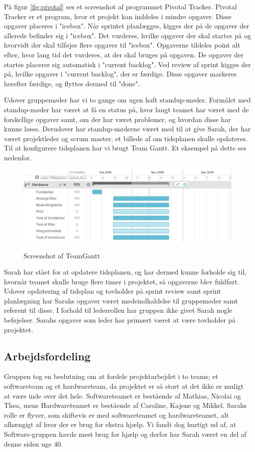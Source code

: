 På figur \vref{fig:pivotal} ses et screenshot af programmet Pivotal Tracker. Pivotal Tracker er et program, hvor et projekt kan inddeles i mindre opgaver. Disse opgaver placeres i "icebox". Når sprintet planlægges, kigges der på de opgaver der allerede befinder sig i "icebox". Det vurderes, hvilke opgaver der skal startes på og hvorvidt der skal tilføjes flere opgaver til "icebox". Opgaverne tildeles point alt efter, hvor lang tid det vurderes, at der skal bruges på opgaven. De opgaver der startes placerer sig automatisk i "current backlog". Ved review af sprint kigges der på, hvilke opgaver i "current backlog", der er færdige. Disse opgaver markeres herefter færdige, og flyttes dermed til "done". 

Udover gruppemøder har vi to gange om ugen haft standup-møder. Formålet med standup-møder har været at få en status på, hvor langt teamet har været med de forskellige opgaver samt, om der har været problemer, og hvordan disse har kunne løses. Derudover har standup-møderne været med til at give Sarah, der har været projektleder og scrum master, et billede af om tidsplanen skulle opdateres. Til at konfigurere tidsplanen har vi brugt Team Gantt. Et eksempel på dette ses nedenfor. 

	\begin{figure}[h!]
	\centering
	\includegraphics[width=0.9\linewidth]{Udviklingsproces/Metode/TeamGantt}
	\label{fig:teamgantt}
	\caption{Screenshot af TeamGantt}
\end{figure}

Sarah har stået for at opdatere tidsplanen, og har dermed kunne forholde sig til, hvornår teamet skulle bruge flere timer i projektet, så opgaverne blev fuldført. Udover opdatering af tidsplan og tovholder på sprint review samt sprint planlægning har Sarahs opgaver været mødeindkaldelse til gruppemøder samt referent til disse. I forhold til lederrollen har gruppen ikke givet Sarah nogle beføjelser. Sarahs opgaver som leder har primært været at være tovholder på projektet. 

\subsection{Arbejdsfordeling}
Gruppen tog en beslutning om at fordele projektarbejdet i to teams; et softwareteam og et hardwareteam, da projektet er så stort at det ikke er muligt at være inde over det hele. Softwareteamet er bestående af Mathias, Nicolai og Thea, mens Hardwareteamet er bestående af Caroline, Kajene og Mikkel. Sarahs rolle er flyver, som skiftevis er med softwareteamet og hardwareteamet, alt afhængigt af hvor der er brug for ekstra hjælp. Vi fandt dog hurtigt ud af, at Software-gruppen havde mest brug for hjælp og derfor har Sarah været en del af denne siden uge 40.

